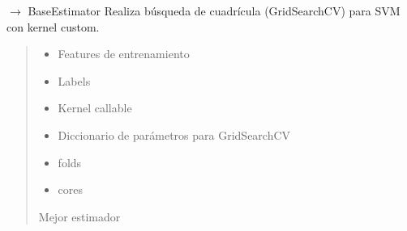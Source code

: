 \documentclass[letterpaper,10pt,english]{sphinxmanual}
\begin{document}
\begin{fulllineitems}
\label{\detokenize{Model:Model.train.tune_svm}}
\pysigstartsignatures
\pysiglinewithargsret
{}
{\sphinxparamcomma {}\sphinxparamcomma {}\sphinxparamcomma {}\sphinxparamcomma {}\sphinxparamcomma {}}
{{ $\rightarrow$ BaseEstimator}}
\pysigstopsignatures
\sphinxAtStartPar
Realiza búsqueda de cuadrícula (GridSearchCV) para SVM con kernel custom.
\begin{quote}\begin{description}
\begin{itemize}
\item {} 
\sphinxAtStartPar
{} \sphinxhyphen{}\sphinxhyphen{} Features de entrenamiento

\item {} 
\sphinxAtStartPar
{} \sphinxhyphen{}\sphinxhyphen{} Labels

\item {} 
\sphinxAtStartPar
{} \sphinxhyphen{}\sphinxhyphen{} Kernel callable

\item {} 
\sphinxAtStartPar
{} \sphinxhyphen{}\sphinxhyphen{} Diccionario de parámetros para GridSearchCV

\item {} 
\sphinxAtStartPar
{} \sphinxhyphen{}\sphinxhyphen{} folds

\item {} 
\sphinxAtStartPar
{} \sphinxhyphen{}\sphinxhyphen{} cores

\end{itemize}

\sphinxAtStartPar
Mejor estimador

\end{description}\end{quote}

\end{fulllineitems}
\end{document}
